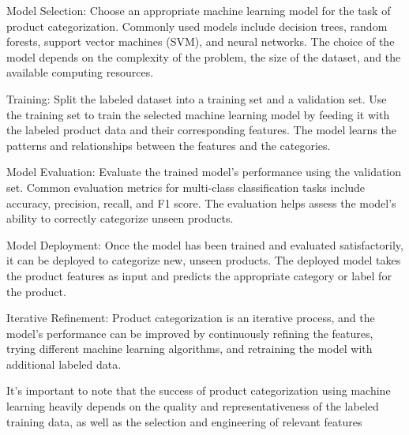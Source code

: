 Model Selection: Choose an appropriate machine learning model for the task of product categorization. Commonly used models include decision trees, random forests, support vector machines (SVM), and neural networks. The choice of the model depends on the complexity of the problem, the size of the dataset, and the available computing resources.

Training: Split the labeled dataset into a training set and a validation set. Use the training set to train the selected machine learning model by feeding it with the labeled product data and their corresponding features. The model learns the patterns and relationships between the features and the categories.

Model Evaluation: Evaluate the trained model's performance using the validation set. Common evaluation metrics for multi-class classification tasks include accuracy, precision, recall, and F1 score. The evaluation helps assess the model's ability to correctly categorize unseen products.

Model Deployment: Once the model has been trained and evaluated satisfactorily, it can be deployed to categorize new, unseen products. The deployed model takes the product features as input and predicts the appropriate category or label for the product.

Iterative Refinement: Product categorization is an iterative process, and the model's performance can be improved by continuously refining the features, trying different machine learning algorithms, and retraining the model with additional labeled data.

It's important to note that the success of product categorization using machine learning heavily depends on the quality and representativeness of the labeled training data, as well as the selection and engineering of relevant features

